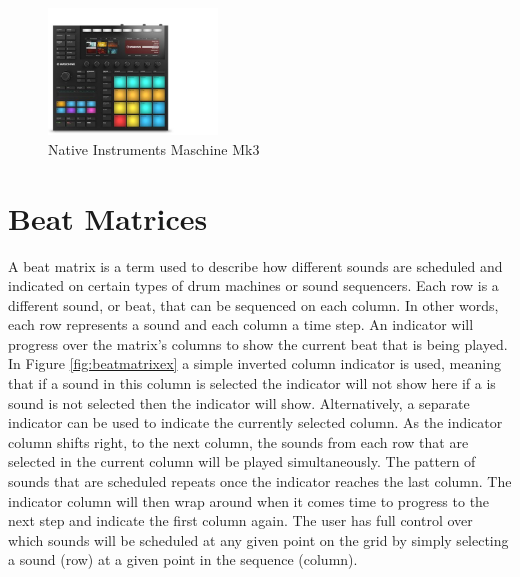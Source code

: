\documentclass[12pt,a4paper]{report}
\begin{document}
\begin{figure}[h!]
	\begin{center}
		\includegraphics[width = 0.4\textwidth, angle=0, origin=c, trim={0 0 140px 35px}, clip]{maschine.jpg}
		\caption{Native Instruments Maschine Mk3 \cite{maschine}}
		\label{fig:maschine}
	\end{center}
\end{figure}
\section{Beat Matrices}\label{sec:beatmatrix}
A beat matrix is a term used to describe how different sounds are scheduled and indicated on certain types of drum machines or sound sequencers. Each row is a different sound, or beat, that can be sequenced on each column. In other words, each row represents a sound and each column a time step. An indicator will progress over the matrix's columns to show the current beat that is being played. In Figure \ref{fig:beatmatrixex} a simple inverted column indicator is used, meaning that if a sound in this column is selected the indicator will not show here if a is sound is not selected then the indicator will show. Alternatively, a separate indicator can be used to indicate the currently selected column. As the indicator column shifts right, to the next column, the sounds from each row that are selected in the current column will be played simultaneously. The pattern of sounds that are scheduled repeats once the indicator reaches the last column. The indicator column will then wrap around when it comes time to progress to the next step and indicate the first column again. The user has full control over which sounds will be scheduled at any given point on the grid by simply selecting a sound (row) at a given point in the sequence (column). 
\end{document}
